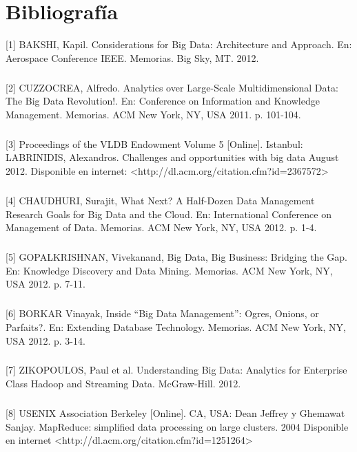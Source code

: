 \chapter{Bibliograf\'ia}
\label{sec:biblio}
[1] BAKSHI, Kapil. Considerations for Big Data: Architecture and Approach. En: Aerospace Conference IEEE. Memorias.  Big Sky, MT. 2012.
\paragraph{}
[2] CUZZOCREA, Alfredo. Analytics over Large-Scale Multidimensional Data: The Big Data Revolution!. En: Conference on Information and Knowledge Management. Memorias. ACM  New York, NY, USA 2011. p. 101-104.
\paragraph{}
[3] Proceedings of the VLDB Endowment Volume 5 [Online]. Istanbul:  LABRINIDIS, Alexandros. Challenges and opportunities with big data August 2012. Disponible en internet: \textless http://dl.acm.org/citation.cfm?id=2367572\textgreater
\paragraph{}
[4] CHAUDHURI, Surajit, What Next? A Half-Dozen Data Management Research Goals for Big Data and the Cloud. En: International Conference on Management of Data. Memorias. ACM New York, NY, USA 2012. p. 1-4.
\paragraph{}
[5] GOPALKRISHNAN, Vivekanand, Big Data, Big Business: Bridging the Gap. En: Knowledge Discovery and Data Mining. Memorias. ACM New York, NY, USA 2012. p. 7-11.
\paragraph{}
[6] BORKAR Vinayak, Inside “Big Data Management”: Ogres, Onions, or Parfaits?. En: Extending Database Technology. Memorias. ACM New York, NY, USA 2012. p. 3-14.
\paragraph{}
[7] ZIKOPOULOS, Paul et al. Understanding Big Data: Analytics for Enterprise Class Hadoop and Streaming Data. McGraw-Hill. 2012.
\paragraph{}
[8] USENIX Association Berkeley [Online]. CA, USA:  Dean Jeffrey y  Ghemawat Sanjay. MapReduce: simplified data processing on large clusters. 2004 Disponible en internet \textless http://dl.acm.org/citation.cfm?id=1251264\textgreater
